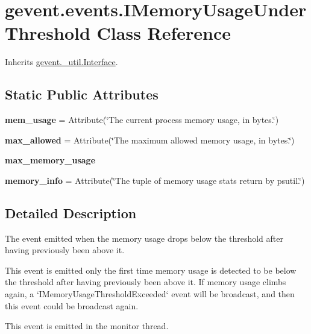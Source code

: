 \hypertarget{classgevent_1_1events_1_1_i_memory_usage_under_threshold}{}\section{gevent.\+events.\+I\+Memory\+Usage\+Under\+Threshold Class Reference}
\label{classgevent_1_1events_1_1_i_memory_usage_under_threshold}


Inherits \hyperlink{classgevent_1_1__util_1_1_interface}{gevent.\+\_\+util.\+Interface}.

\subsection*{Static Public Attributes}
\begin{DoxyCompactItemize}
\item 
\mbox{\label{classgevent_1_1events_1_1_i_memory_usage_under_threshold_a1d297362fa56e6de2d1069282a2cbe34}} 
{\bfseries mem\+\_\+usage} = Attribute(\char`\"{}The current process memory usage, in bytes.\char`\"{})
\item 
\mbox{\label{classgevent_1_1events_1_1_i_memory_usage_under_threshold_af09952811e206decada60942b41b6b8a}} 
{\bfseries max\+\_\+allowed} = Attribute(\char`\"{}The maximum allowed memory usage, in bytes.\char`\"{})
\item 
{\bfseries max\+\_\+memory\+\_\+usage}
\item 
\mbox{\label{classgevent_1_1events_1_1_i_memory_usage_under_threshold_ae2acab445a2b7ed855a316d06459adb1}} 
{\bfseries memory\+\_\+info} = Attribute(\char`\"{}The tuple of memory usage stats return by psutil.\char`\"{})
\end{DoxyCompactItemize}


\subsection{Detailed Description}
\begin{DoxyVerb}The event emitted when the memory usage drops below the
threshold after having previously been above it.

This event is emitted only the first time memory usage is detected
to be below the threshold after having previously been above it.
If memory usage climbs again, a `IMemoryUsageThresholdExceeded`
event will be broadcast, and then this event could be broadcast again.

This event is emitted in the monitor thread.
\end{DoxyVerb}
 

